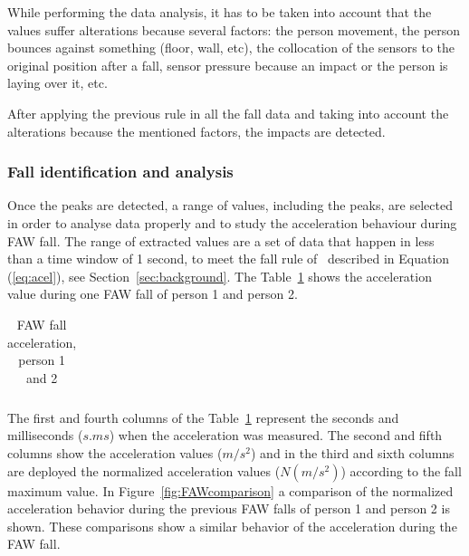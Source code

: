 \documentclass[review]{elsarticle}
\begin{document}
While performing the data analysis, it has to be taken into account that the values suffer 
alterations because several factors: the person movement, the person bounces against something 
(floor, wall, etc), the collocation of the sensors to the original position after a fall, 
sensor pressure because an impact or the person is laying over it, etc.

After applying the previous rule in all the fall data and taking into account the alterations 
because the mentioned factors, the impacts are detected.

\subsubsection*{Fall identification and analysis} Once the peaks are detected, a range of values, 
including the peaks, are selected in order to analyse data properly and to study the acceleration 
behaviour during FAW fall. The range of extracted values are a set of data that happen in less 
than a time window of 1 second, to meet the fall rule of~\cite{Luder2009} described in Equation (\ref{eq:acel}), see Section~\ref{sec:background}. The Table~\ref{tabla:FAW} shows the 
acceleration value during one FAW fall of person 1 and person 2. 

\begin{table}[!ht]
	\centering
	\begin{tabular}{*{5}{r}}
		
	\end{tabular}
	\caption{FAW fall acceleration, person 1 and 2}%
	\label{tabla:FAW}
\end{table}

The first and fourth columns of the Table~\ref{tabla:FAW} represent the seconds and milliseconds ($s.ms$) when the acceleration was measured. The second and fifth columns show the acceleration values ($m/s^2$) and in the third and sixth columns are deployed the normalized acceleration values 
($N(m/s^2)$) according to the fall maximum value. In Figure~\ref{fig:FAWcomparison} a comparison of the normalized acceleration behavior during the previous FAW falls of person 1 and person 2 is shown. These comparisons show a similar behavior of the acceleration during the FAW fall. \newpage
\end{document}
